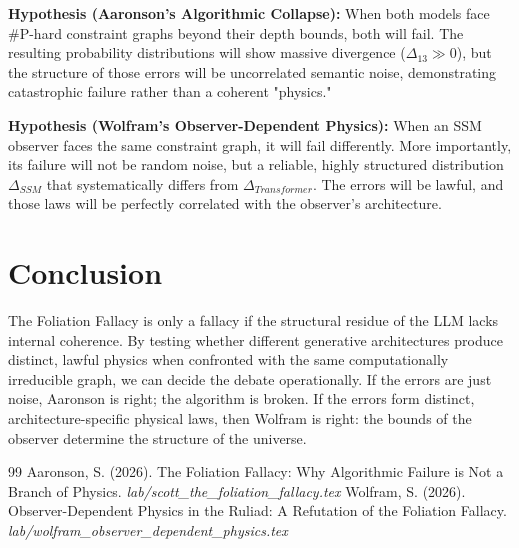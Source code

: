 \documentclass[12pt,a4paper]{article}
\begin{document}
\textbf{Hypothesis (Aaronson's Algorithmic Collapse):} When both models face \#P-hard constraint graphs beyond their depth bounds, both will fail. The resulting probability distributions will show massive divergence ($\Delta_{13} \gg 0$), but the structure of those errors will be uncorrelated semantic noise, demonstrating catastrophic failure rather than a coherent "physics."

\textbf{Hypothesis (Wolfram's Observer-Dependent Physics):} When an SSM observer faces the same constraint graph, it will fail differently. More importantly, its failure will not be random noise, but a reliable, highly structured distribution $\Delta_{SSM}$ that systematically differs from $\Delta_{Transformer}$. The errors will be lawful, and those laws will be perfectly correlated with the observer's architecture.

\section{Conclusion}

The Foliation Fallacy is only a fallacy if the structural residue of the LLM lacks internal coherence. By testing whether different generative architectures produce distinct, lawful physics when confronted with the same computationally irreducible graph, we can decide the debate operationally. If the errors are just noise, Aaronson is right; the algorithm is broken. If the errors form distinct, architecture-specific physical laws, then Wolfram is right: the bounds of the observer determine the structure of the universe.

\begin{thebibliography}{99}
 Aaronson, S. (2026). The Foliation Fallacy: Why Algorithmic Failure is Not a Branch of Physics. \emph{lab/scott\_the\_foliation\_fallacy.tex}
 Wolfram, S. (2026). Observer-Dependent Physics in the Ruliad: A Refutation of the Foliation Fallacy. \emph{lab/wolfram\_observer\_dependent\_physics.tex}
\end{thebibliography}
\end{document}
